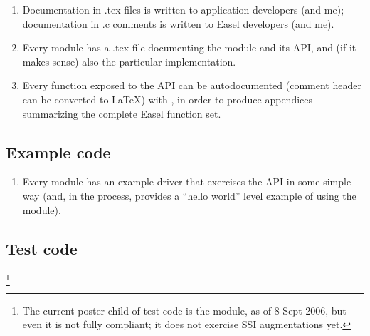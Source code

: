 \begin{enumerate}
\item Documentation in .tex files is written to application developers
      (and me); documentation in .c comments is written to Easel
      developers (and me).

\item Every module has a .tex file documenting the module and its API,
      and (if it makes sense) also the particular implementation.

\item Every function exposed to the API can be autodocumented (comment
      header can be converted to \LaTeX) with
      , in order to produce appendices
      summarizing the complete Easel function set.
\end{enumerate}

\subsection{Example code}

\begin{enumerate}
\item Every module has an example driver that exercises the API in
      some simple way (and, in the process, provides a ``hello world''
      level example of using the module).
\end{enumerate}

\subsection{Test code}

\footnote{The current poster child of test code is the 
module, as of 8 Sept 2006, but even it is not fully compliant; it does
not exercise SSI augmentations yet.}

